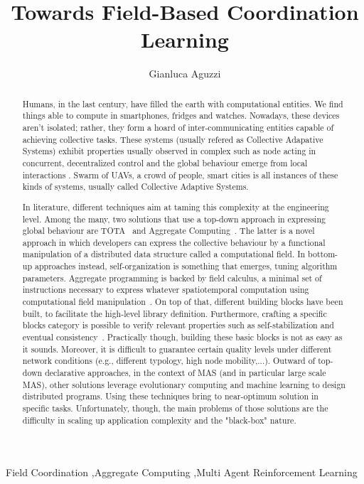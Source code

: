 \documentclass[3p]{elsarticle}
\begin{document}
\begin{frontmatter}

\title{Towards Field-Based Coordination Learning} %


\author{Gianluca Aguzzi}
\address{\texttt{gianluca.aguzzi@unibo.it}}
\begin{abstract}
Humans, in the last century, have filled the earth with computational entities. 
%
We find things able to compute in smartphones, fridges and watches. %
Nowadays, these devices aren't isolated; rather, they form a hoard of inter-communicating entities capable of achieving collective tasks. 
These systems (usually refered as Collective Adapative Systems) exhibit properties usually observed in complex such as node acting in concurrent, 
decentralized control and the global behaviour emerge from local interactions \cite{DBLP:conf/huc/Ferscha15}. 
Swarm of UAVs, a crowd of people, smart cities is all instances of these kinds of systems, usually called Collective Adaptive Systems.

In literature, different techniques aim at taming this complexity at the engineering level.
%
Among the many, two solutions that use a top-down approach in expressing global behaviour are TOTA~\cite{DBLP:journals/tosem/MameiZ09} and Aggregate Computing~\cite{DBLP:journals/computer/BealPV15}.
%
The latter is a novel approach in which developers can express the collective behaviour by 
a functional manipulation of a distributed data structure called a computational field.
%
In bottom-up approaches instead, self-organization is something that emerges, tuning algorithm parameters.
%
Aggregate programming is backed by field calculus, a minimal set of instructions necessary to express whatever spatiotemporal computation using computational field manipulation~\cite{DBLP:conf/coordination/AudritoBDV18}. 
%
On top of that, different building blocks have been built, to facilitate the high-level library definition.
%
Furthermore, crafting a specific blocks category is possible to verify relevant properties such as self-stabilization \cite{DBLP:conf/coordination/ViroliD14} and eventual consistency~\cite{DBLP:conf/saso/BealVPD16}.
%
Practically though, building these basic blocks is not as easy as it sounds. Moreover, it is difficult to guarantee certain quality levels under different network conditions (e.g., different typology, high node mobility,...).
%
Outward of top-down declarative approaches, in the context of MAS (and in particular large scale MAS), other solutions leverage evolutionary computing and machine learning to design distributed programs. Using these techniques bring to near-optimum solution in specific tasks. 
%
Unfortunately, though, the main problems of those solutions are the difficulty in scaling up application complexity and the "black-box" nature.
%

\end{abstract}
\begin{keyword}
Field Coordination \sep Aggregate Computing \sep Multi Agent Reinforcement Learning
\end{keyword}

\end{frontmatter}


\end{document}
